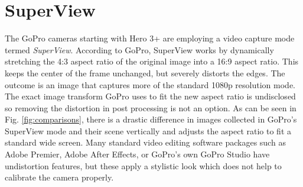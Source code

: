 \section{SuperView}\label{sec:superview}
The GoPro cameras starting with Hero 3+ are employing a video capture mode termed {\em SuperView}. According to GoPro, SuperView works by dynamically stretching the 4:3 aspect ratio of the original image into a 16:9 aspect ratio. This keeps the center of the frame unchanged, but severely distorts the edges. The outcome is an image that captures more of the standard 1080p resolution mode. The exact image transform GoPro uses to fit the new aspect ratio is undisclosed so removing the distortion in post processing is not an option. As can be seen in Fig. \ref{fig:comparisons}, there is a drastic difference in images collected in GoPro's SuperView mode and their scene vertically and adjusts the aspect ratio to fit a standard wide screen. Many standard video editing software packages such as Adobe Premier, Adobe After Effects, or GoPro's own GoPro Studio have undistortion features, but these apply a stylistic look which does not help to calibrate the camera properly. 